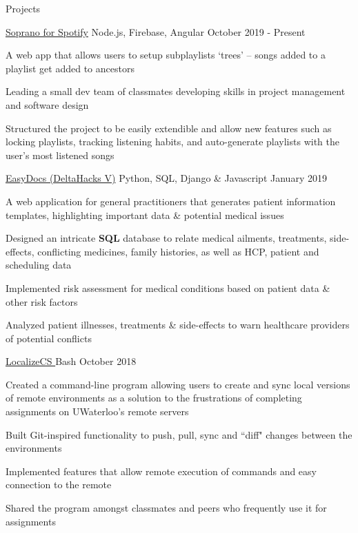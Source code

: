 \documentclass{resume} %
\begin{document}
\begin{rSection}{Projects}

    \begin{sideproject}
        {\href{https://walk-site.herokuapp.com/sub-playlists}{\faGlobe{} Soprano for Spotify}}
        {Node.js, Firebase, Angular}
        {October 2019 - Present}
        {
            \item A web app that allows users to setup subplaylists `trees' -- songs added to a playlist get added to ancestors
            \item Leading a small dev team of classmates developing skills in project management and software design
            \item Structured the project to be easily extendible and allow new features such as locking playlists, tracking listening habits, and auto-generate playlists with the user's most listened songs
        }
    \end{sideproject}
    
    \vspace{1em}
    
    \begin{sideproject}
        {\href{https://github.com/wbhildeb/EasyDocs}{\faGithub{} EasyDocs (DeltaHacks V)}}
        {Python, SQL, Django \& Javascript}
        {January 2019}
        {
            \item A web application for general practitioners that generates patient information templates, highlighting important data \& potential medical issues
            \item Designed an intricate \textbf{SQL} database to relate medical ailments, treatments, side-effects, conflicting medicines, family histories, as well as HCP, patient and scheduling data
            \item Implemented risk assessment for medical conditions based on patient data \& other risk factors
            \item Analyzed patient illnesses, treatments \& side-effects to warn healthcare providers of potential conflicts
        }
    \end{sideproject}

    \vspace{1em}

    \begin{sideproject}
        {\href{https://github.com/wbhildeb/localize-cs}{\faGithub{} LocalizeCS }}
        {Bash}
        {October 2018}
        {
            \item Created a command-line program allowing users to create and sync local versions of remote environments as
            a solution to the frustrations of completing assignments on UWaterloo's remote servers
            \item Built Git-inspired functionality to push, pull, sync and ``diff" changes between the environments
            \item Implemented features that allow remote execution of commands and easy connection to the remote
            \item Shared the program amongst classmates and peers who frequently use it for assignments
        }
    \end{sideproject}
    

\end{rSection}
\end{document}
